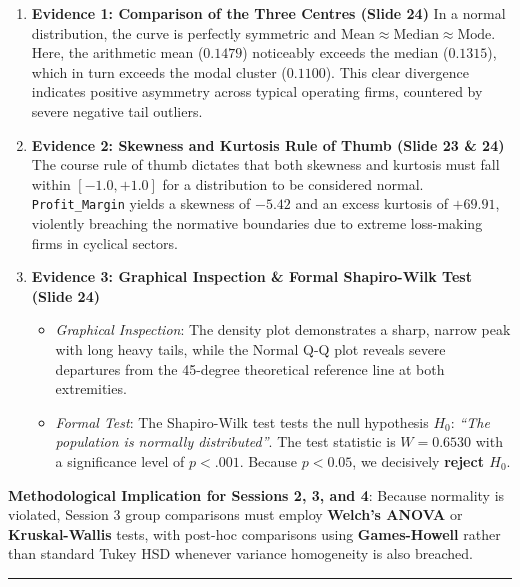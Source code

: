 \documentclass[
]{article}
\providecommand{\tightlist}{%
  \setlength{\itemsep}{0pt}\setlength{\parskip}{0pt}}
\begin{document}
\begin{enumerate}
\def\labelenumi{\arabic{enumi}.}
\tightlist
\item
  \textbf{Evidence 1: Comparison of the Three Centres (Slide 24)} In a
  normal distribution, the curve is perfectly symmetric and
  \(\text{Mean} \approx \text{Median} \approx \text{Mode}\). Here, the
  arithmetic mean (\(0.1479\)) noticeably exceeds the median
  (\(0.1315\)), which in turn exceeds the modal cluster (\(0.1100\)).
  This clear divergence indicates positive asymmetry across typical
  operating firms, countered by severe negative tail outliers.
\item
  \textbf{Evidence 2: Skewness and Kurtosis Rule of Thumb (Slide 23 \&
  24)} The course rule of thumb dictates that both skewness and kurtosis
  must fall within \([-1.0, +1.0]\) for a distribution to be considered
  normal. \texttt{Profit\_Margin} yields a skewness of \(-5.42\) and an
  excess kurtosis of \(+69.91\), violently breaching the normative
  boundaries due to extreme loss-making firms in cyclical sectors.
\item
  \textbf{Evidence 3: Graphical Inspection \& Formal Shapiro-Wilk Test
  (Slide 24)}

  \begin{itemize}
  \tightlist
  \item
    \emph{Graphical Inspection}: The density plot demonstrates a sharp,
    narrow peak with long heavy tails, while the Normal Q-Q plot reveals
    severe departures from the 45-degree theoretical reference line at
    both extremities.
  \item
    \emph{Formal Test}: The Shapiro-Wilk test tests the null hypothesis
    \(H_0\): \emph{``The population is normally distributed''}. The test
    statistic is \(W = 0.6530\) with a significance level of
    \(p < .001\). Because \(p < 0.05\), we decisively \textbf{reject
    \(H_0\)}.
  \end{itemize}
\end{enumerate}

\textbf{Methodological Implication for Sessions 2, 3, and 4}: Because
normality is violated, Session 3 group comparisons must employ
\textbf{Welch's ANOVA} or \textbf{Kruskal-Wallis} tests, with post-hoc
comparisons using \textbf{Games-Howell} rather than standard Tukey HSD
whenever variance homogeneity is also breached.

\begin{center}\rule{0.5\linewidth}{0.5pt}\end{center}
\end{document}
